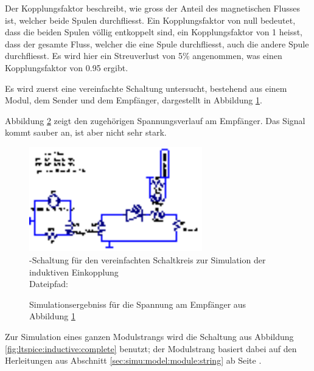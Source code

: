 Der Kopplungsfaktor beschreibt, wie gross  der Anteil des magnetischen Flusses
ist, welcher beide Spulen durchfliesst. Ein Kopplungsfaktor von null bedeutet,
dass die  beiden Spulen  v\"ollig entkoppelt sind,  ein Kopplungsfaktor  von 1
heisst, dass der gesamte Fluss, welcher  die eine Spule durchfliesst, auch die
andere Spule durchfliesst.  Es wird  hier ein Streuverlust von 5\% angenommen,
was einen Kopplungsfaktor von 0.95 ergibt.

\clearpage
Es  wird   zuerst  eine  vereinfachte  Schaltung   untersucht,  bestehend  aus
einem  Modul,  dem  Sender  und  dem  Empf\"anger,  dargestellt  in  Abbildung
\ref{fig:ltspice:inductive:singleModule}.

Abbildung   \ref{fig:simu:inductive:singleModule}   zeigt  den   zugeh\"origen
Spannungsverlauf am Empf\"anger.   Das Signal kommt sauber an,  ist aber nicht
sehr stark.

\begin{figure}[h!tb]
    \centering
    \includegraphics[width=0.67\textwidth]{images/ltspice/jac/inductive-singleModule.eps}
    \caption[Induktive Einkopplung, vereinfachte -Schaltung]{%
        -Schaltung f\"ur den vereinfachten Schaltkreis zur
        Simulation der induktiven Einkopplung\protect\\
        Dateipfad: %
    }
    \label{fig:ltspice:inductive:singleModule}
\end{figure}

\begin{figure}[h!tb]
    
    \caption[Simulationsergebniss induktive Einkopplung, vereinfachte Schaltung]{%
        Simulationsergebniss f\"ur die Spannung am Empf\"anger aus Abbildung
        \ref{fig:ltspice:inductive:singleModule}%
    }
    \label{fig:simu:inductive:singleModule}
\end{figure}

\clearpage
Zur  Simulation eines  ganzen Modulstrangs  wird die  Schaltung aus  Abbildung
\ref{fig:ltspice:inductive:complete}  benutzt; der  Modulstrang basiert  dabei
auf den Herleitungen aus Abschnitt \ref{sec:simu:model:module:string} ab Seite
\pageref{sec:simu:model:module:string}.

